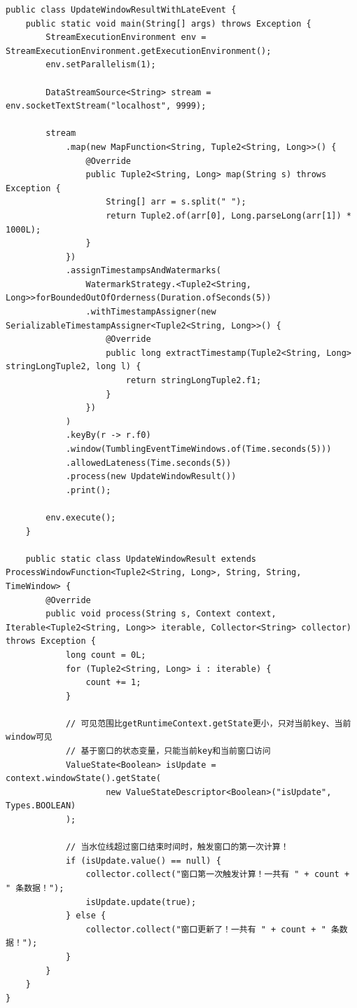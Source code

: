 \documentclass[cn,11pt,chinese]{elegantbook}
\begin{document}
\begin{verbatim}
public class UpdateWindowResultWithLateEvent {
    public static void main(String[] args) throws Exception {
        StreamExecutionEnvironment env = StreamExecutionEnvironment.getExecutionEnvironment();
        env.setParallelism(1);

        DataStreamSource<String> stream = env.socketTextStream("localhost", 9999);

        stream
            .map(new MapFunction<String, Tuple2<String, Long>>() {
                @Override
                public Tuple2<String, Long> map(String s) throws Exception {
                    String[] arr = s.split(" ");
                    return Tuple2.of(arr[0], Long.parseLong(arr[1]) * 1000L);
                }
            })
            .assignTimestampsAndWatermarks(
                WatermarkStrategy.<Tuple2<String, Long>>forBoundedOutOfOrderness(Duration.ofSeconds(5))
                .withTimestampAssigner(new SerializableTimestampAssigner<Tuple2<String, Long>>() {
                    @Override
                    public long extractTimestamp(Tuple2<String, Long> stringLongTuple2, long l) {
                        return stringLongTuple2.f1;
                    }
                })
            )
            .keyBy(r -> r.f0)
            .window(TumblingEventTimeWindows.of(Time.seconds(5)))
            .allowedLateness(Time.seconds(5))
            .process(new UpdateWindowResult())
            .print();

        env.execute();
    }

    public static class UpdateWindowResult extends ProcessWindowFunction<Tuple2<String, Long>, String, String, TimeWindow> {
        @Override
        public void process(String s, Context context, Iterable<Tuple2<String, Long>> iterable, Collector<String> collector) throws Exception {
            long count = 0L;
            for (Tuple2<String, Long> i : iterable) {
                count += 1;
            }

            // 可见范围比getRuntimeContext.getState更小，只对当前key、当前window可见
            // 基于窗口的状态变量，只能当前key和当前窗口访问
            ValueState<Boolean> isUpdate = context.windowState().getState(
                    new ValueStateDescriptor<Boolean>("isUpdate", Types.BOOLEAN)
            );

            // 当水位线超过窗口结束时间时，触发窗口的第一次计算！
            if (isUpdate.value() == null) {
                collector.collect("窗口第一次触发计算！一共有 " + count + " 条数据！");
                isUpdate.update(true);
            } else {
                collector.collect("窗口更新了！一共有 " + count + " 条数据！");
            }
        }
    }
}
\end{verbatim}
\end{document}
